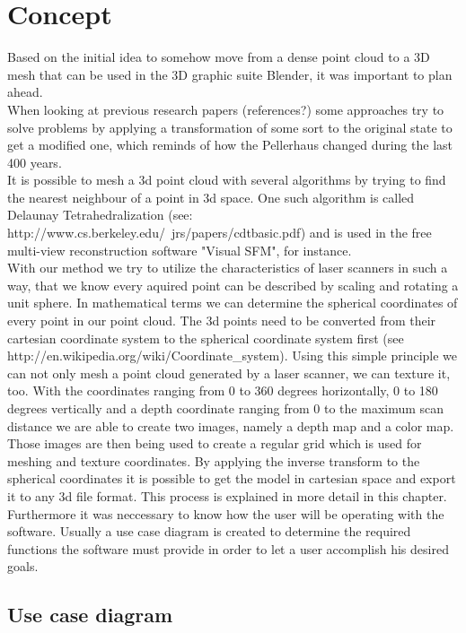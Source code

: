 \section{Concept}

Based on the initial idea to somehow move from a dense point cloud to a 3D mesh that can be used in the 3D graphic suite Blender, it was important to plan ahead.\\
When looking at previous research papers (references?) some approaches try to solve problems by applying a transformation of some sort to the original state to get a modified one, which reminds of how the Pellerhaus changed during the last 400 years.\\
It is possible to mesh a 3d point cloud with several algorithms by trying to find the nearest neighbour of a point in 3d space. One such algorithm is called Delaunay Tetrahedralization  (see: http://www.cs.berkeley.edu/~jrs/papers/cdtbasic.pdf) and is used in the free multi-view reconstruction software "Visual SFM", for instance.\\
With our method we try to utilize the characteristics of laser scanners in such a way, that we know every aquired point can be described by scaling and rotating a unit sphere. In mathematical terms we can determine the spherical coordinates of every point in our point cloud. The 3d points need to be converted from their cartesian coordinate system to the spherical coordinate system first (see  http://en.wikipedia.org/wiki/Coordinate\_system). Using this simple principle we can not only mesh a point cloud generated by a laser scanner, we can texture it, too. With the coordinates ranging from 0 to 360 degrees horizontally, 0 to 180 degrees vertically and a depth coordinate ranging from 0 to the maximum scan distance we are able to create two images, namely a depth map and a color map. Those images are then being used to create a regular grid which is used for meshing and texture coordinates. By applying the inverse transform to the spherical coordinates it is possible to get the model in cartesian space and export it to any 3d file format. This process is explained in more detail in this chapter.\\
Furthermore it was neccessary to know how the user will be operating with the software. Usually a use case diagram is created to determine the required functions the software must provide in order to let a user accomplish his desired goals.

\pagebreak

\subsection{Use case diagram}


